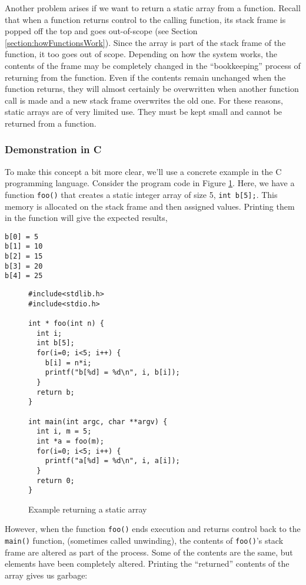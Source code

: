 Another problem arises if we want to return a static array from
a function.  Recall that when a function returns control to the 
calling function, its stack frame is popped off the top and 
goes out-of-scope (see Section \ref{section:howFunctionsWork}).
Since the array is part of the stack frame of the function, it
too goes out of scope.  Depending on how the system works, 
the contents of the frame may be completely changed in the
``bookkeeping'' process of returning from the function.  Even
if the contents remain unchanged when the function returns,
they will almost certainly be overwritten when another function
call is made and a new stack frame overwrites the old one.
For these reasons, static arrays are of very limited use.  They
must be kept small and cannot be returned from a function.

\subsubsection{Demonstration in C}

To make this concept a bit more clear, we'll use a concrete
example in the C programming language.  Consider the 
program code in Figure \ref{code:returnStaticArray}.  Here,
we have a function \texttt{foo()} that creates a
static integer array of size 5, \texttt{int b[5];}.  This
memory is allocated on the stack frame and then assigned
values.  Printing them in the function will give the expected
results, 

\begin{verbatim}
b[0] = 5
b[1] = 10
b[2] = 15
b[3] = 20
b[4] = 25
\end{verbatim}

\begin{figure}[!h]
\centering
\begin{verbatim}
#include<stdlib.h>
#include<stdio.h>

int * foo(int n) {
  int i;
  int b[5];
  for(i=0; i<5; i++) {
    b[i] = n*i;
    printf("b[%d] = %d\n", i, b[i]);
  }
  return b;
}

int main(int argc, char **argv) {
  int i, m = 5;
  int *a = foo(m);
  for(i=0; i<5; i++) {
    printf("a[%d] = %d\n", i, a[i]);
  }
  return 0;
}
\end{verbatim}
\caption{Example returning a static array}
\label{code:returnStaticArray}
\end{figure}

However, when the function \texttt{foo()} ends execution and 
returns control back to the \texttt{main()} function, (sometimes 
called \gls{unwinding}), the contents of \texttt{foo()}'s stack
frame are altered as part of the process.  Some of the contents are the
same, but elements have been completely altered.  Printing the ``returned'' 
contents of the array gives us garbage:  

